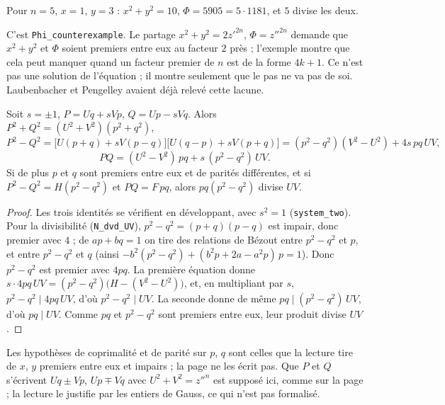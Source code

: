 \begin{contrexemple}
Pour $n = 5$, $x = 1$, $y = 3$ : $x^2+y^2 = 10$, $\Phi = 5905 = 5 \cdot 1181$, et $5$ divise les deux.
\end{contrexemple}

C'est \texttt{Phi\_counterexample}. Le partage $x^2+y^2 = 2z'^{2n}$, $\Phi = z''^{2n}$ demande que $x^2+y^2$ et $\Phi$ soient premiers entre eux au facteur $2$ près ; l'exemple montre que cela peut manquer quand un facteur premier de $n$ est de la forme $4k+1$. Ce n'est pas une solution de l'équation ; il montre seulement que le pas ne va pas de soi. Laubenbacher et Pengelley avaient déjà relevé cette lacune.

\begin{enonce}
Soit $s = \pm 1$, $P = Uq + sVp$, $Q = Up - sVq$. Alors $P^2 + Q^2 = (U^2+V^2)(p^2+q^2)$,
\[ P^2 - Q^2 = \bigl[U(p+q) + sV(p-q)\bigr]\bigl[U(q-p) + sV(p+q)\bigr] = (p^2-q^2)(V^2-U^2) + 4s\,pq\,UV, \]
\[ PQ = (U^2-V^2)\,pq + s\,(p^2-q^2)\,UV. \]
Si de plus $p$ et $q$ sont premiers entre eux et de parités différentes, et si $P^2 - Q^2 = H(p^2-q^2)$ et $PQ = F\,pq$, alors $pq(p^2-q^2)$ divise $UV$.
\end{enonce}

\begin{proof}
Les trois identités se vérifient en développant, avec $s^2 = 1$ (\texttt{system\_two}). Pour la divisibilité (\texttt{N\_dvd\_UV}), $p^2 - q^2 = (p+q)(p-q)$ est impair, donc premier avec $4$ ; de $ap + bq = 1$ on tire des relations de Bézout entre $p^2-q^2$ et $p$, et entre $p^2-q^2$ et $q$ (ainsi $-b^2(p^2-q^2) + (b^2p + 2a - a^2p)\,p = 1$). Donc $p^2-q^2$ est premier avec $4pq$. La première équation donne $s \cdot 4pq\,UV = (p^2-q^2)\bigl(H - (V^2-U^2)\bigr)$, et, en multipliant par $s$, $p^2-q^2 \mid 4pq\,UV$, d'où $p^2-q^2 \mid UV$. La seconde donne de même $pq \mid (p^2-q^2)\,UV$, d'où $pq \mid UV$. Comme $pq$ et $p^2-q^2$ sont premiers entre eux, leur produit divise $UV$.
\end{proof}

\begin{remarque}
Les hypothèses de coprimalité et de parité sur $p$, $q$ sont celles que la lecture tire de $x$, $y$ premiers entre eux et impairs ; la page ne les écrit pas. Que $P$ et $Q$ s'écrivent $Uq \pm Vp$, $Up \mp Vq$ avec $U^2 + V^2 = z''^n$ est supposé ici, comme sur la page ; la lecture le justifie par les entiers de Gauss, ce qui n'est pas formalisé.
\end{remarque}

